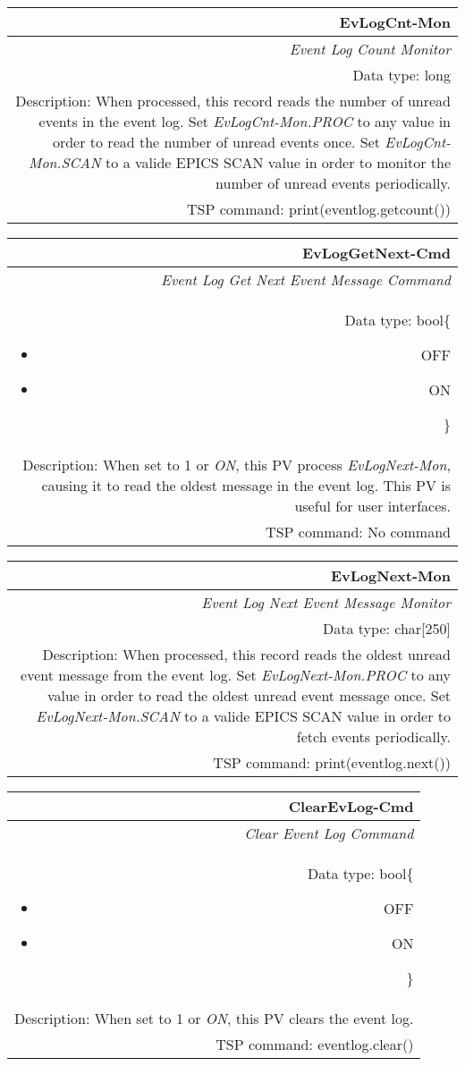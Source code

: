 \documentclass[openany]{article}
\begin{document}
		\begin{tabular}{N}
			\hline
			\bfseries EvLogCnt-Mon\label{pv:evlogcount-mon} \\ \hline
			\emph{Event Log Count Monitor} \\
			Data type: long \\
			Description: When processed, this record reads the number of unread events in the event log. Set \emph{EvLogCnt-Mon.PROC} to any value in order to read the number of unread events once. Set \emph{EvLogCnt-Mon.SCAN} to a valide EPICS SCAN value in order to monitor the number of unread events periodically. \\
			TSP command: print(eventlog.getcount())
		\end{tabular}

		\begin{tabular}{N}
			\hline
			\bfseries EvLogGetNext-Cmd\label{pv:evloggetnext-mon} \\ \hline
			\emph{Event Log Get Next Event Message Command} \\
			Data type: bool\{\begin{itemize}[noitemsep]
				\small
				\item[] OFF
				\item[] ON
			\end{itemize}\} \\
			Description: When set to 1 or \emph{ON}, this PV process \emph{EvLogNext-Mon}, causing it to read the oldest message in the event log. This PV is useful for user interfaces. \\
			TSP command: No command
		\end{tabular}

		\begin{tabular}{N}
			\hline
			\bfseries EvLogNext-Mon\label{pv:evlognext-mon} \\ \hline
			\emph{Event Log Next Event Message Monitor} \\
			Data type: char[250] \\
			Description: When processed, this record reads the oldest unread event message from the event log. Set \emph{EvLogNext-Mon.PROC} to any value in order to read the oldest unread event message once. Set \emph{EvLogNext-Mon.SCAN} to a valide EPICS SCAN value in order to fetch events periodically. \\
			TSP command: print(eventlog.next())
		\end{tabular}

		\begin{tabular}{N}
			\hline
			\bfseries ClearEvLog-Cmd\label{pv:clearevlog-cmd} \\ \hline
			\emph{Clear Event Log Command} \\
			Data type: bool\{\begin{itemize}[noitemsep]
				\small
				\item[] OFF
				\item[] ON
			\end{itemize}\} \\
			Description: When set to 1 or \emph{ON}, this PV clears the event log. \\
			TSP command: eventlog.clear()
		\end{tabular}
\end{document}

